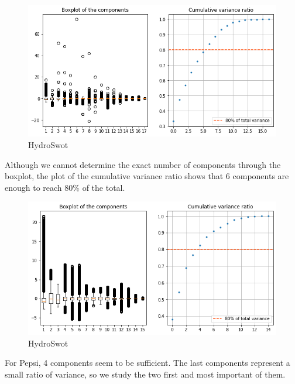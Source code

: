  \begin{figure}[H]
     \centering
     \includegraphics[scale = 0.6]{Graph/hydro_pca.png}
     \caption{HydroSwot}
     \label{fig:my_label}
 \end{figure}
 
Although we cannot determine the exact number of components through the boxplot, the plot of the cumulative variance ratio shows that 6 components are enough to reach $80\%$ of the total. 

 \begin{figure}[H]
     \centering
     \includegraphics[scale = 0.6]{Graph/pepsi_pca.png}
     \caption{HydroSwot}
     \label{fig:my_label}
 \end{figure}

For Pepsi, 4 components seem to be sufficient. The last components represent a small ratio of variance, so we study the two first and most important of them. 


